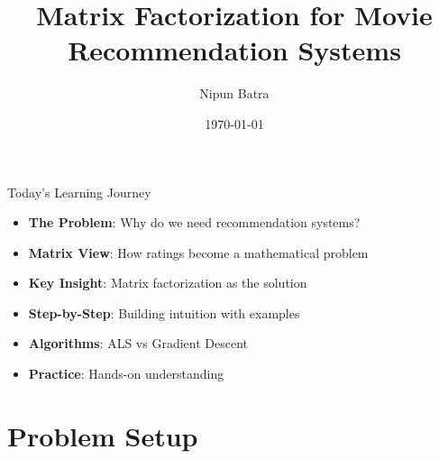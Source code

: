 \documentclass{beamer}
\title{Matrix Factorization for Movie Recommendation Systems}
\date{\today}
\author{Nipun Batra}
\institute{IIT Gandhinagar}
\begin{document}
\maketitle

\begin{frame}{Today's Learning Journey}
\begin{itemize}[<+->]
    \item \textbf{The Problem}: Why do we need recommendation systems?
    \item \textbf{Matrix View}: How ratings become a mathematical problem
    \item \textbf{Key Insight}: Matrix factorization as the solution
    \item \textbf{Step-by-Step}: Building intuition with examples
    \item \textbf{Algorithms}: ALS vs Gradient Descent
    \item \textbf{Practice}: Hands-on understanding
\end{itemize}
\end{frame}

\section{Problem Setup}
\end{document}
